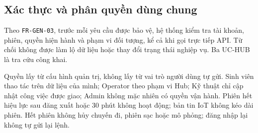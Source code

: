 \subsection{Xác thực và phân quyền dùng chung}
\label{sec:common-access}

Theo \texttt{FR-GEN-03}, trước mỗi yêu cầu được bảo vệ, hệ thống kiểm tra tài khoản, phiên, quyền hiện hành và phạm vi đối tượng, kể cả khi gọi trực tiếp API. Từ chối không được làm lộ dữ liệu hoặc thay đổi trạng thái nghiệp vụ. Ba UC-HUB là tra cứu công khai.

Quyền lấy từ cấu hình quản trị, không lấy từ vai trò người dùng tự gửi. Sinh viên thao tác trên dữ liệu của mình; Operator theo phạm vi Hub; Kỹ thuật chỉ cập nhật công việc được giao; Admin không mặc nhiên có quyền vận hành. Phiên hết hiệu lực sau đăng xuất hoặc 30 phút không hoạt động; bản tin IoT không kéo dài phiên. Hết phiên không hủy chuyến đi, phiên sạc hoặc mô phỏng; đăng nhập lại không tự gửi lại lệnh.
